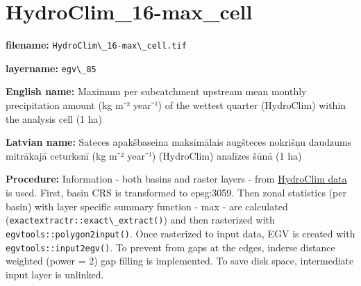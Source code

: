 \documentclass[
]{book}
\newcommand{\passthrough}[1]{#1}
\begin{document}
\section{HydroClim\_16-max\_cell}\label{ch06.085}

\textbf{filename:} \passthrough{\lstinline!HydroClim\_16-max\_cell.tif!}

\textbf{layername:} \passthrough{\lstinline!egv\_85!}

\textbf{English name:} Maximum per subcatchment upstream mean monthly precipitation amount (kg m⁻² year⁻¹) of the wettest quarter (HydroClim) within the analysis cell (1 ha)

\textbf{Latvian name:} Sateces apakšbaseina maksimālais augšteces nokrišņu daudzums mitrākajā ceturksnī (kg m⁻² year⁻¹) (HydroClim) analīzes šūnā (1 ha)

\textbf{Procedure:} Information - both basins and raster layers - from \hyperref[Ch04.12]{HydroClim data}
is used. First, basin CRS is transformed to epsg:3059. Then zonal statistics (per basin) with
layer specific summary function - max - are calculated (\passthrough{\lstinline!exactextractr::exact\_extract()!})
and then rasterized with \passthrough{\lstinline!egvtools::polygon2input()!}. Once rasterized to input data,
EGV is created with \passthrough{\lstinline!egvtools::input2egv()!}. To prevent from gaps at the edges,
inderse distance weighted (power = 2) gap filling is implemented. To save disk space,
intermediate input layer is unlinked.
\end{document}
